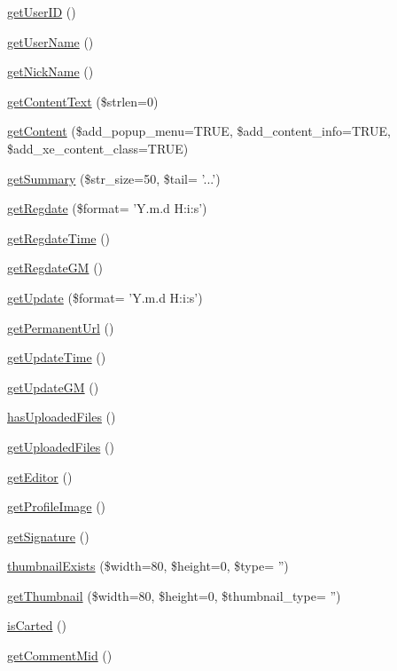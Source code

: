 \begin{DoxyCompactItemize}
\hyperlink{classcommentItem_a5c793e6542e731da5d465c35c77b42fd}{get\-User\-I\-D} ()
\item 
\hyperlink{classcommentItem_a1c35032d37e80ad5018a02787f0091fe}{get\-User\-Name} ()
\item 
\hyperlink{classcommentItem_a097673677cd1c461040cbc9275b7fca9}{get\-Nick\-Name} ()
\item 
\hyperlink{classcommentItem_a5bd758e385068bff00ffc35a0737ff72}{get\-Content\-Text} (\$strlen=0)
\item 
\hyperlink{classcommentItem_afae7151c28cc9066f9c40a010597b25a}{get\-Content} (\$add\-\_\-popup\-\_\-menu=T\-R\-U\-E, \$add\-\_\-content\-\_\-info=T\-R\-U\-E, \$add\-\_\-xe\-\_\-content\-\_\-class=T\-R\-U\-E)
\item 
\hyperlink{classcommentItem_aabe11142b19d831c5e3120e48bb169f7}{get\-Summary} (\$str\-\_\-size=50, \$tail= '...')
\item 
\hyperlink{classcommentItem_acae004be4282c96181e79cc0f3b3adfa}{get\-Regdate} (\$format= 'Y.\-m.\-d H\-:i\-:s')
\item 
\hyperlink{classcommentItem_adb5754f10a245c54a0beb4f6fb22f0e3}{get\-Regdate\-Time} ()
\item 
\hyperlink{classcommentItem_ae5f0203691b6d16a2d99ae40d67adb3f}{get\-Regdate\-G\-M} ()
\item 
\hyperlink{classcommentItem_aa7a413ef04f4c64c779a8bb119a5c214}{get\-Update} (\$format= 'Y.\-m.\-d H\-:i\-:s')
\item 
\hyperlink{classcommentItem_adc6e6a36fd7c02a2f0fecc8a22f9b13b}{get\-Permanent\-Url} ()
\item 
\hyperlink{classcommentItem_a59d0264c1b6842c6a0dfa21a6dfe1edb}{get\-Update\-Time} ()
\item 
\hyperlink{classcommentItem_aab0135e2edd37a47cc390da9b4c79dfa}{get\-Update\-G\-M} ()
\item 
\hyperlink{classcommentItem_abe1774ffe4e8c0f5c14822c5698433da}{has\-Uploaded\-Files} ()
\item 
\hyperlink{classcommentItem_aaa9c1ef5cfd0ce69fd83d8d980360ee5}{get\-Uploaded\-Files} ()
\item 
\hyperlink{classcommentItem_aa27b1c1916b9df510c495655af07bfdf}{get\-Editor} ()
\item 
\hyperlink{classcommentItem_a9baa56f4aa9515c433494778e75c9e85}{get\-Profile\-Image} ()
\item 
\hyperlink{classcommentItem_a97eea3e5359c0ffe84db781d5e5fbff6}{get\-Signature} ()
\item 
\hyperlink{classcommentItem_a1523ec4128cf464d13ca1fb1c2078a0f}{thumbnail\-Exists} (\$width=80, \$height=0, \$type= '')
\item 
\hyperlink{classcommentItem_a9ba96d0703304547c3f494403a86e522}{get\-Thumbnail} (\$width=80, \$height=0, \$thumbnail\-\_\-type= '')
\item 
\hyperlink{classcommentItem_aee548a05480bd060de454017aa8be318}{is\-Carted} ()
\item 
\hyperlink{classcommentItem_ade6e5c8ad3846e0475e89083e2de4669}{get\-Comment\-Mid} ()
\end{DoxyCompactItemize}
